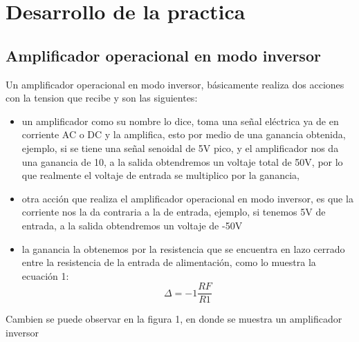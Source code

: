 \documentclass[11pt,a4paper]{article}
\begin{document}
\section{Desarrollo de la practica}

\subsection{Amplificador operacional en modo inversor}

Un amplificador operacional en modo inversor, básicamente realiza dos acciones con la tension que recibe y son las siguientes:

\begin{itemize}
\item un amplificador como su nombre lo dice, toma una señal eléctrica ya de en corriente AC o DC y la amplifica, esto por medio de una ganancia obtenida, ejemplo, si se tiene una señal senoidal de 5V pico, y el amplificador nos da una ganancia de 10, a la salida obtendremos un voltaje total de 50V, por lo que realmente el voltaje de entrada se multiplico por la ganancia,
\item otra acción que realiza  el amplificador operacional en modo inversor, es que la corriente nos la da contraria a la de entrada, ejemplo, si tenemos 5V de entrada, a la salida obtendremos un voltaje de -50V
\item la ganancia la obtenemos por la resistencia que se encuentra en lazo cerrado entre la resistencia de la entrada de alimentación, como lo muestra la ecuación 1:
\begin{equation}
\Delta=-1\frac{RF}{R1}
\end{equation}
\end{itemize}

Cambien se puede observar en la figura 1, en donde se muestra un amplificador inversor
\end{document}
